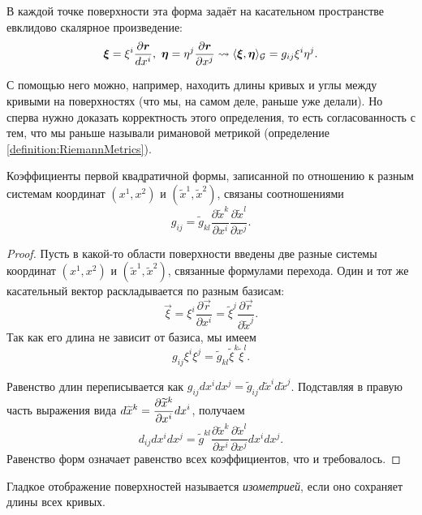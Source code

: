 В каждой точке поверхности эта форма задаёт на касательном пространстве евклидово скалярное произведение:
\[
	\vec{\xi} = \xi^i\frac{\partial \vec{r}}{dx^i},\ \vec{\eta} = \eta^j\frac{\partial \vec{r}}{\partial x^j} \leadsto \langle\vec{\xi}, \vec{\eta}\rangle_\G = g_{ij}\xi^i\eta^j.
\]

С помощью него можно, например, находить длины кривых и углы между кривыми на поверхностях (что мы, на самом деле, раньше уже делали). Но сперва нужно доказать корректность этого определения, то есть согласованность с тем, что мы раньше называли римановой метрикой (определение \ref{definition:RiemannMetrics}).

\begin{proposition}
	Коэффициенты первой квадратичной формы, записанной по отношению к разным системам координат $(x^1, x^2)$ и $(\widetilde{x}^1, \widetilde{x}^2)$, связаны соотношениями
	\[
		g_{ij} = \widetilde{g}_{kl}\frac{\partial\widetilde{x}^k}{\partial x^i}\frac{\partial \widetilde{x}^l}{\partial x^j}.
	\]
\end{proposition}

\begin{proof}
	Пусть в какой-то области поверхности введены две разные системы координат $(x^1, x^2)$ и $(\widetilde{x}^1, \widetilde{x}^2)$, связанные формулами перехода. Один и тот же касательный вектор раскладывается по разным базисам:
	\[
		\vec{\xi} = \xi^i\frac{\partial\vec{r}}{\partial x^i} = \widetilde{\xi}^j\frac{\partial\vec{r}}{\partial\widetilde{x}^j}.
	\]
	Так как его длина не зависит от базиса, мы имеем
	\[
		g_{ij}\xi^i\xi^j = \widetilde{g}_{kl}\widetilde{\xi}^k\widetilde{\xi}^l.
	\]

	Равенство длин переписывается как $g_{ij}dx^idx^j = \widetilde{g}_{ij}d\widetilde{x}^id\widetilde{x}^j$. Подставляя в правую часть выражения вида $\displaystyle d\widetilde{x}^k = \frac{\partial\widetilde{x}^k}{\partial x^i}dx^i$, получаем
	\[
		d_{ij}dx^idx^j = \widetilde{g}^{kl}\frac{\partial\widetilde{x}^k}{\partial x^i}\frac{\partial\widetilde{x}^l}{\partial x^j}dx^idx^j.
	\]
	Равенство форм означает равенство всех коэффициентов, что и требовалось.
\end{proof}

\begin{definition}
	Гладкое отображение поверхностей называется \textit{изометрией}, если оно сохраняет длины всех кривых.
\end{definition}

